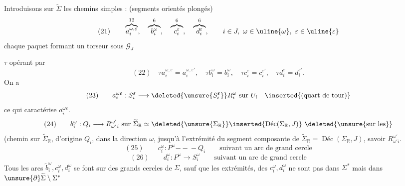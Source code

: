 Introduisons sur $\widetilde\Sigma$ les  chemins simples : (segments orientés plongés)
\[
(21)\qquad\overbrace{a_i^{\omega,\varepsilon}}^{12},\quad
\overbrace{b_i^\omega}^{6},\quad\overbrace{c_i^\varepsilon}^{6},\quad\overbrace{d_i^\varepsilon}^{6},\qquad
i\in J,\ \omega\in\uline{\omega},\ \varepsilon\in\uline{\varepsilon}
\]
chaque paquet  formant un torseur sous $\mathcal G_J$

$\tau$ opérant par
\[
(22)\quad \tau a_i^{\omega,\varepsilon}=a_i^{\omega,\varepsilon'},\quad
\tau b_i^\omega=b_i^\omega,\quad \tau c_i^\varepsilon=c_i^{\varepsilon'},\quad \tau d_i^\varepsilon=d_i^{\varepsilon'}.
\]
On a
\[
(23)\qquad a_i^{\omega\varepsilon}:S_i^\varepsilon\longrightarrow\deleted{\unsure{S_i^\varepsilon}}R_i^\omega\text{ sur }U_i\quad\inserted{(\text{quart de tour})}
\]
ce qui caractérise $a_i^{\omega\varepsilon}$. 
\[
(24)\qquad b_i^\omega:Q_i\longrightarrow R_{\omega'i}^{\omega'}\text{ sur }\widetilde\Sigma_{\mathbb R}\simeq\deleted{\unsure{\Sigma_{\mathbb R}}}\inserted{\operatorname{\text{Déc}}(\Sigma_{\mathbb R},J)}\ \deleted{\unsure{\text{sur les}}}
\]
(chemin sur $\widetilde\Sigma_{\mathbb R}$, d'origine $Q_i$, dans la direction $\omega$, jusqu'à l'extrémité  du segment composante de $\widetilde\Sigma_{\mathbb R}=\operatorname{\text{Déc}}(\Sigma_{\mathbb R},J)$, savoir $R_{\omega'i}^{\omega'}$.
\[
(25)\qquad c_i^\omega:P^\omega\mathrel{-\!\!\!-\!\!\!-}Q_i\qquad\text{suivant un arc de grand cercle}
\]
\[
(26)\qquad d_i^\omega:P^\omega\longrightarrow S_i^\omega\qquad\text{suivant un arc de grand cercle}
\]
Tous les arcs $\widetilde b_i^\omega,c_i^\omega,d_i^\omega$ se font sur des grands cercles de $\Sigma$, sauf que les extrémités, des $c_i^\omega,d_i^\omega$ ne sont pas dans $\Sigma^*$ mais dans  $\unsure{\partial}\widetilde\Sigma\setminus\Sigma^*$
